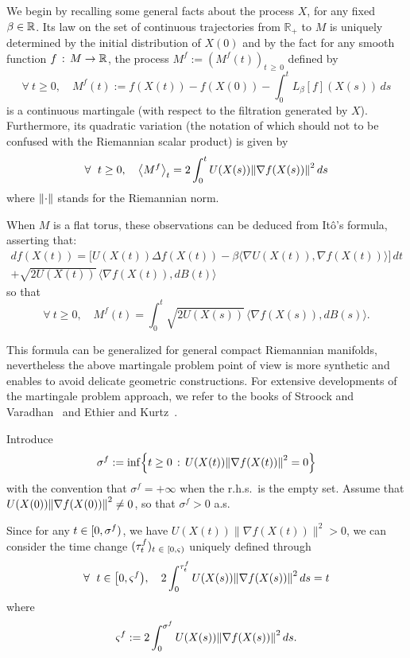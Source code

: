 \documentclass[AHL,Unicode,longabstracts,published]{cedram}
\newcommand{\RR}{\mathbb{R}}
\newcommand{\iy}{\infty}
\newcommand{\na}{\nabla}
\newcommand{\tr}{\Delta}
\newcommand{\fo}{\forall\ }
\let\originalleft\left
\let\originalright\right
\renewcommand{\left}{\mathopen{}\mathclose\bgroup\originalleft}
\renewcommand{\right}{\aftergroup\egroup\originalright}
\let\oldin\in
\renewcommand{\in}{\mathchoice{\oldin}{\oldin}{\,\oldin\,}{\,\oldin\,}}
\renewcommand*{\to}{\mathchoice{\longrightarrow}{\rightarrow}{\rightarrow}{\rightarrow}}
\let\oldforall\forall
\renewcommand*{\forall}{\mathrel{\oldforall}}
\begin{document}
We begin by recalling some general facts about the process $X$, for any fixed $\beta\in\RR$. Its law on the set of continuous trajectories from $\RR_+$ to $M$ is uniquely determined by the initial distribution of $X(0)$ and by the fact for any smooth function $f\,:\, M\to \RR$, the process $M^f:= (M^f(t))_{t\,\geq\,0}$ defined by
\begin{equation*}
\fo t\geq 0,\quad M^f(t) := f(X(t))-f(X(0))-\int_0^tL_\beta[f](X(s))\, ds
\end{equation*} 
is a continuous martingale (with respect to the filtration generated by $X$). Furthermore, its quadratic variation (the notation of which should not to be confused with the Riemannian scalar product) is given by
\begin{equation}\label{lanMranf}
\fo t\geq 0,\quad \left\langle M^f\right\rangle_t = 2\int_0^t U(X(s))\left\| \na f(X(s))\right\|^2\, ds
\end{equation}
where $\left\| \cdot\right\|$ stands for the Riemannian norm.


When $M$ is a flat torus, these observations can be deduced from Itô's formula, asserting that:
\begin{align*}
d f(X(t))=\bigl[U(X(t))\tr f(X(t))-\beta \langle \na U(X(t)), \na f(X(t))\rangle\bigr] \, dt \\
+\sqrt{2 U(X(t))}\, \langle \na f(X(t)),dB(t)\rangle
\end{align*}
so that
\begin{equation*}
\fo t\geq 0,\quad M^f(t) = \int_0^t\sqrt{2 U(X(s))}\, \langle \na f(X(s)),dB(s)\rangle.
\end{equation*}


This formula can be generalized for general compact Riemannian manifolds, nevertheless the above martingale problem point of view is more synthetic and enables to avoid delicate geometric constructions. For extensive developments of the martingale problem approach, we refer to the books of Stroock and Varadhan~\cite{MR2190038} and Ethier and Kurtz~\cite{MR838085}.


 Introduce
\begin{equation*}
\sigma^f := \inf\left\{t\geq 0\,:\, U(X(t))\left\| \na f(X(t))\right\|^2=0\right\}
\end{equation*}
with the convention that $\sigma^f=+\iy$ when the r.h.s.\ is the empty set. Assume that $U(X(0))\left\| \na f(X(0))\right\|^2\neq 0$, so that $\sigma^f>0$ a.s.


Since for any $t\in[0,\sigma^f)$, we have $ U(X(t))\| \na f(X(t))\|^2>0$, we can consider the time change $(\tau^f_t)_{t\in[0,\varsigma)}$ uniquely defined through
\begin{equation*}
\fo t\in\bigl[0,\varsigma^f\bigr),\quad 2\int_0^{\tau^f_t} U(X(s))\left\| \na f(X(s))\right\|^2\, ds = t
\end{equation*}
where
\begin{equation*}
\varsigma^f := 2\int_0^{\sigma^f} U(X(s))\left\| \na f(X(s))\right\|^2\, ds.
\end{equation*}
\end{document}
